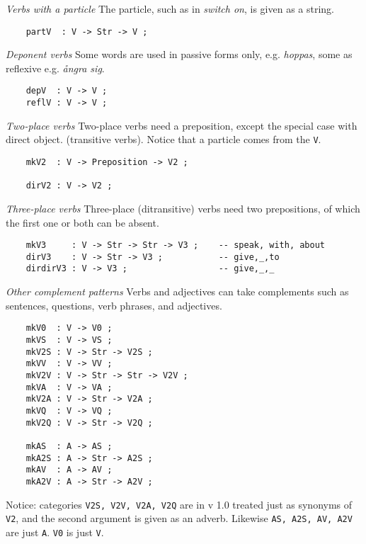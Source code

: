 \documentclass[11pt,a4paper]{article}
\newcommand{\subsubsubsection}[1]{\textit{#1}}
\begin{document}
\subsubsubsection{Verbs with a particle}
The particle, such as in \textit{switch on}, is given as a string.

\begin{verbatim}
    partV  : V -> Str -> V ;
\end{verbatim}

\subsubsubsection{Deponent verbs}
Some words are used in passive forms only, e.g. \textit{hoppas}, some as
reflexive e.g. \textit{ångra sig}.

\begin{verbatim}
    depV  : V -> V ;
    reflV : V -> V ;
\end{verbatim}

\subsubsubsection{Two-place verbs}
Two-place verbs need a preposition, except the special case with direct object.
(transitive verbs). Notice that a particle comes from the \texttt{V}.

\begin{verbatim}
    mkV2  : V -> Preposition -> V2 ;
  
    dirV2 : V -> V2 ;
\end{verbatim}

\subsubsubsection{Three-place verbs}
Three-place (ditransitive) verbs need two prepositions, of which
the first one or both can be absent.

\begin{verbatim}
    mkV3     : V -> Str -> Str -> V3 ;    -- speak, with, about
    dirV3    : V -> Str -> V3 ;           -- give,_,to
    dirdirV3 : V -> V3 ;                  -- give,_,_
\end{verbatim}

\subsubsubsection{Other complement patterns}
Verbs and adjectives can take complements such as sentences,
questions, verb phrases, and adjectives.

\begin{verbatim}
    mkV0  : V -> V0 ;
    mkVS  : V -> VS ;
    mkV2S : V -> Str -> V2S ;
    mkVV  : V -> VV ;
    mkV2V : V -> Str -> Str -> V2V ;
    mkVA  : V -> VA ;
    mkV2A : V -> Str -> V2A ;
    mkVQ  : V -> VQ ;
    mkV2Q : V -> Str -> V2Q ;
  
    mkAS  : A -> AS ;
    mkA2S : A -> Str -> A2S ;
    mkAV  : A -> AV ;
    mkA2V : A -> Str -> A2V ;
\end{verbatim}

Notice: categories \texttt{V2S, V2V, V2A, V2Q} are in v 1.0 treated
just as synonyms of \texttt{V2}, and the second argument is given
as an adverb. Likewise \texttt{AS, A2S, AV, A2V} are just \texttt{A}.
\texttt{V0} is just \texttt{V}.
\end{document}

